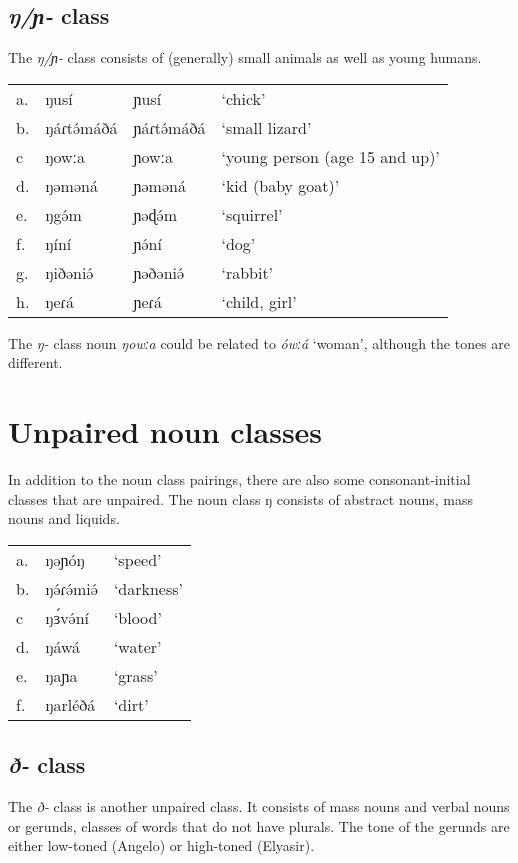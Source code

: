 \subsection{\textit{ŋ/ɲ-} class}
The \textit{ŋ/ɲ-} class consists of (generally) small animals as well as young humans. 

\ea	
\begin{tabular}[t]{llll}
a.	&	ŋusí		&	ɲusí	&	‘chick’\\
b.	&	ŋáɾtə́máðá	&	ɲáɾtə́máðá&	‘small lizard’\\
c	&	ŋowːa		&	ɲowːa	&	‘young person (age 15 and up)’\\
d.	&	ŋəməná		&	ɲəməná	&	‘kid (baby goat)’\\
e.	&	ŋgə́m			&	ɲəɖə́m	&	‘squirrel’\\
f.	&	ŋíní		&	ɲə́ní		&	‘dog’\\
g.	&	ŋiðəniə́		&	ɲəðəniə́	&	‘rabbit’\\
h.	&	ŋeɾá		&	ɲeɾá	&	‘child, girl’	\\
\end{tabular}
\z
The \textit{ŋ-} class noun \textit{ŋowːa} could be related to \textit{ówːá} ‘woman’, although the tones are different. %

\section{Unpaired noun classes}
In addition to the noun class pairings, there are also some consonant-initial classes that are unpaired. The noun class ŋ consists of abstract nouns, mass nouns and liquids. 

\ea	
\begin{tabular}[t]{lll}
a.	&	ŋəɲóŋ		&	‘speed’\\
b.	&	ŋə́ɾə́miə́		&	‘darkness’\\
c	&	ŋɜ́və́ní	 	&	‘blood’\\
d.	&	ŋáwá		&	‘water’\\
e.	&	ŋaɲa	 	&	‘grass’\\
f.	&	ŋarléðá		&	‘dirt’\\	
\end{tabular}

\z

\subsection{\textit{ð-} class}

The \textit{ð-} class is another unpaired class. It consists of mass nouns and verbal nouns or gerunds, classes of words that do not have plurals. The tone of the gerunds are either low-toned (Angelo) or high-toned (Elyasir). 

